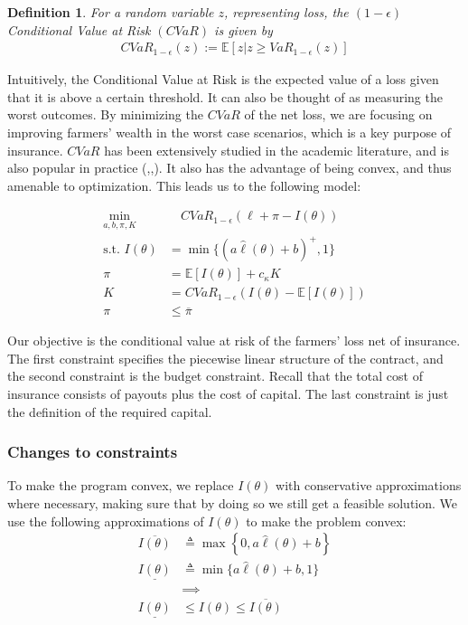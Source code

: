 \documentclass[11pt]{article}
\newtheorem{defn}[lemma]{Definition}
\begin{document}
    \begin{defn}
      For a random variable $z$, representing loss, the $(1-\epsilon)$ Conditional Value at Risk $(CVaR)$ is given by 
      \begin{align*}
        CVaR_{1-\epsilon}(z) := \mathbb{E}\left [z | z \geq VaR_{1-\epsilon}(z) \right ]
      \end{align*}
    \end{defn}
  
    Intuitively, the Conditional Value at Risk is the expected value of a loss given that it is above a certain threshold. It can also be thought of as measuring the worst outcomes. By minimizing the $CVaR$ of the net loss, we are focusing on improving farmers' wealth in the worst case scenarios, which is a key purpose of insurance. $CVaR$ has been extensively studied in the academic literature, and is also popular in practice (\cite{rockafellar2000optimization},\cite{rockafellar2002conditional},\cite{artzner1999coherent}). It also has the advantage of being convex, and thus amenable to optimization. This leads us to the following model: 
  
    \begin{align}
        \min_{a,b,\pi, K}  & \quad CVaR_{1-\epsilon}\left ( \ell + \pi - I(\theta) \right)\\
        \text{s.t.   }I(\theta) &= \min \{ (a\hat{\ell}(\theta) + b)^+,1\} \\
        \pi &= \mathbb{E}\left [ I(\theta) \right ] + c_{\kappa} K \\
        K &=  CVaR_{1-\epsilon}\left ( I(\theta)  - \mathbb{E}[I(\theta)] \right ) \label{cons-budget} \\
        \pi &\leq \overline{\pi}
    \end{align}
  
    Our objective is the conditional value at risk of the farmers' loss net of insurance. The first constraint specifies the piecewise linear structure of the contract, and the second constraint is the budget constraint. Recall that the total cost of insurance consists of payouts plus the cost of capital. The last constraint is just the definition of the required capital. 
    
    \subsubsection{Changes to constraints}
        To make the program convex, we replace $I(\theta)$ with conservative approximations where necessary, making sure that by doing so we still get a feasible solution. We use the following approximations of $I(\theta)$ to make the problem convex: 
      \begin{align*}
        \overline{I(\theta)} &\triangleq \max \left \{ 0,a\hat{\ell}(\theta) + b\right \} \\
        \underline{I(\theta)} &\triangleq \min \{ a\hat{\ell}(\theta) + b,1 \}\\
        &\implies \\
        \underline{I(\theta)} &\leq I(\theta) \leq \overline{I(\theta)}
        \end{align*}
    
\end{document}
